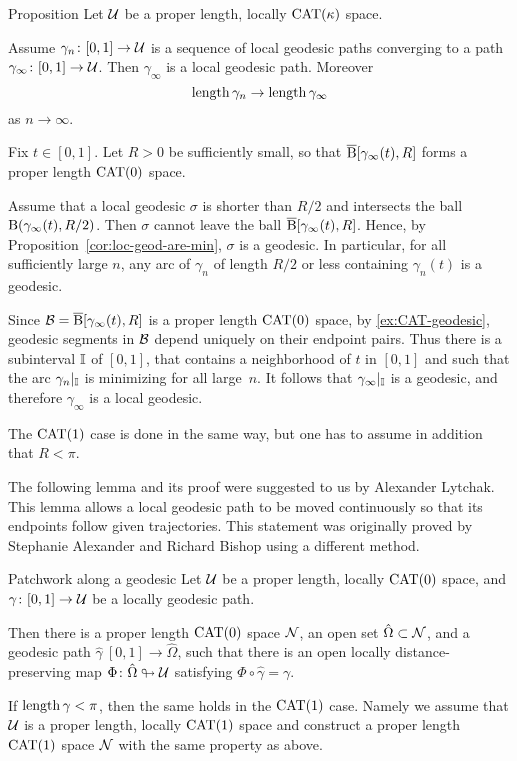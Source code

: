 \begin{thm}{Proposition}\label{prop:geo-complete}
Let $\mathcal{U}$ be a proper length, locally $\mathrm{CAT}(\kappa)$ space.

Assume $\gamma_n\colon[0,1]\to\mathcal{U}$ is a sequence of local geodesic paths converging to a path $\gamma_\infty\colon[0,1]\to\mathcal{U}$.
Then $\gamma_\infty$ is a local geodesic path.
Moreover 
\[\mathop{\rm length}\nolimits\gamma_n\to\mathop{\rm length}\nolimits\gamma_\infty\]
as $n\to\infty$.
\end{thm}

Fix $t\in[0,1]$.  
Let $R>0$ be sufficiently small, so that $\overline{\mathrm{B}}{}[\gamma_\infty(t),R]$ forms a proper length $\mathrm{CAT}(0)$ space.

Assume that  a local geodesic $\sigma$  is shorter than $R/2$ and intersects the ball $\mathrm{B}{}(\gamma_\infty(t),R/2)$.
Then $\sigma$ cannot leave the ball $\overline{\mathrm{B}}{}[\gamma_\infty(t),R]$.
Hence, by Proposition~\ref{cor:loc-geod-are-min}, $\sigma$ is a geodesic.  
In particular, for all sufficiently large $n$, any arc of $\gamma_n$ of length $R/2$ or less containing $\gamma_n(t)$ is a geodesic.

Since $\mathcal{B}=\overline{\mathrm{B}}{}[\gamma_\infty(t),R]$ is a proper length $\mathrm{CAT}(0)$ space, by \ref{ex:CAT-geodesic},
geodesic segments in $\mathcal{B}$ depend uniquely on their endpoint pairs.  
Thus there is a subinterval $\mathbb{I}$ of $[0,1]$,
that  contains a neighborhood of $t$ in $[0,1]$
and such that the arc $\gamma_n|_{\mathbb{I}}$ is minimizing for all large~$n$.
It follows that $\gamma_\infty|_{\mathbb{I}}$ is a geodesic,
and therefore $\gamma_\infty$ is a local geodesic.

The $\mathrm{CAT}(1)$ case is done in the same way, but one has to assume in addition that $R<\pi$.
\qeds

The following lemma and its proof were suggested to us by Alexander Lytchak.  
This lemma allows  a local geodesic path 
to be moved continuously so that its endpoints follow given trajectories.
This statement was originally proved by Stephanie Alexander and Richard Bishop \cite{alexander-bishop-1990} using a different method.

\begin{thm}{Patchwork along a geodesic}
\label{lem:patch}
Let $\mathcal{U}$ be a proper length, locally $\mathrm{CAT}(0)$ space, 
and $\gamma\colon[0,1]\to\mathcal{U}$ be a locally geodesic path.

Then there is a proper length  $\mathrm{CAT}(0)$ space   $\mathcal{N}$,
an open set $\hat\Omega\subset \mathcal{N}$,
and a geodesic path $\hat\gamma\:[0,1]\to\hat\Omega$,
such that there is an open locally distance-preserving map 
$\Phi\colon\hat\Omega\looparrowright\mathcal{U}$ satisfying
$\Phi\circ\hat\gamma=\gamma$.

If $\mathop{\rm length}\nolimits\gamma<\pi$,
then the same holds in the $\mathrm{CAT}(1)$ case.
Namely we assume that $\mathcal{U}$ is a proper length, 
locally $\mathrm{CAT}(1)$ space and construct a proper length $\mathrm{CAT}(1)$ space $\mathcal{N}$ with the same property as above.
\end{thm}


